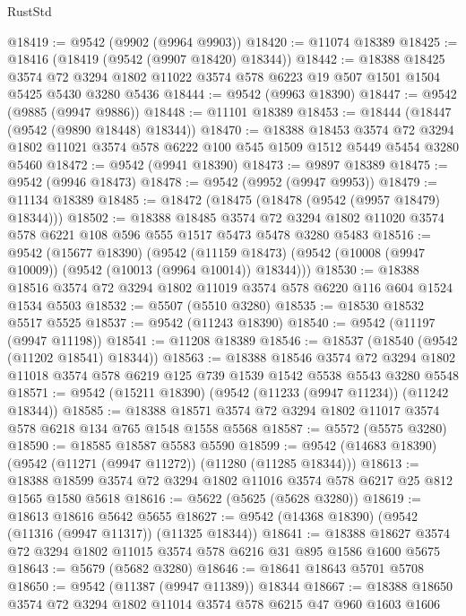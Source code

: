 \begin{lexlean}{RustStd}
\begin{coremodule}
{\begin{coremodule}
{{{{{{{{{{{{{{{{{{{{{{{{{{{{{{{{{@18419 := @9542 (@9902 (@9964 @9903))
@18420 := @11074 @18389
@18425 := @18416 (@18419 (@9542 (@9907 @18420) @18344))
@18442 := @18388
    @18425
    @3574
    @72
    @3294
    @1802
    @11022
    @3574
    @578
    @6223
    @19
    @507
    @1501
    @1504
    @5425
    @5430
    @3280
    @5436
@18444 := @9542 (@9963 @18390)
@18447 := @9542 (@9885 (@9947 @9886))
@18448 := @11101 @18389
@18453 := @18444 (@18447 (@9542 (@9890 @18448) @18344))
@18470 := @18388
    @18453
    @3574
    @72
    @3294
    @1802
    @11021
    @3574
    @578
    @6222
    @100
    @545
    @1509
    @1512
    @5449
    @5454
    @3280
    @5460
@18472 := @9542 (@9941 @18390)
@18473 := @9897 @18389
@18475 := @9542 (@9946 @18473)
@18478 := @9542 (@9952 (@9947 @9953))
@18479 := @11134 @18389
@18485 := @18472 (@18475 (@18478 (@9542 (@9957 @18479) @18344)))
@18502 := @18388
    @18485
    @3574
    @72
    @3294
    @1802
    @11020
    @3574
    @578
    @6221
    @108
    @596
    @555
    @1517
    @5473
    @5478
    @3280
    @5483
@18516 := @9542
    (@15677 @18390)
    (@9542 (@11159 @18473) (@9542 (@10008 (@9947 @10009)) (@9542 (@10013 (@9964 @10014)) @18344)))
@18530 := @18388 @18516 @3574 @72 @3294 @1802 @11019 @3574 @578 @6220 @116 @604 @1524 @1534 @5503
@18532 := @5507 (@5510 @3280)
@18535 := @18530 @18532 @5517 @5525
@18537 := @9542 (@11243 @18390)
@18540 := @9542 (@11197 (@9947 @11198))
@18541 := @11208 @18389
@18546 := @18537 (@18540 (@9542 (@11202 @18541) @18344))
@18563 := @18388
    @18546
    @3574
    @72
    @3294
    @1802
    @11018
    @3574
    @578
    @6219
    @125
    @739
    @1539
    @1542
    @5538
    @5543
    @3280
    @5548
@18571 := @9542 (@15211 @18390) (@9542 (@11233 (@9947 @11234)) (@11242 @18344))
@18585 := @18388 @18571 @3574 @72 @3294 @1802 @11017 @3574 @578 @6218 @134 @765 @1548 @1558 @5568
@18587 := @5572 (@5575 @3280)
@18590 := @18585 @18587 @5583 @5590
@18599 := @9542 (@14683 @18390) (@9542 (@11271 (@9947 @11272)) (@11280 (@11285 @18344)))
@18613 := @18388 @18599 @3574 @72 @3294 @1802 @11016 @3574 @578 @6217 @25 @812 @1565 @1580 @5618
@18616 := @5622 (@5625 (@5628 @3280))
@18619 := @18613 @18616 @5642 @5655
@18627 := @9542 (@14368 @18390) (@9542 (@11316 (@9947 @11317)) (@11325 @18344))
@18641 := @18388 @18627 @3574 @72 @3294 @1802 @11015 @3574 @578 @6216 @31 @895 @1586 @1600 @5675
@18643 := @5679 (@5682 @3280)
@18646 := @18641 @18643 @5701 @5708
@18650 := @9542 (@11387 (@9947 @11389)) @18344
@18667 := @18388
    @18650
    @3574
    @72
    @3294
    @1802
    @11014
    @3574
    @578
    @6215
    @47
    @960
    @1603
    @1606
}}}}}}}}}}}}}}}}}}}}}}}}}}}}}}}}}
\end{coremodule}}
\end{coremodule}
\end{lexlean}
